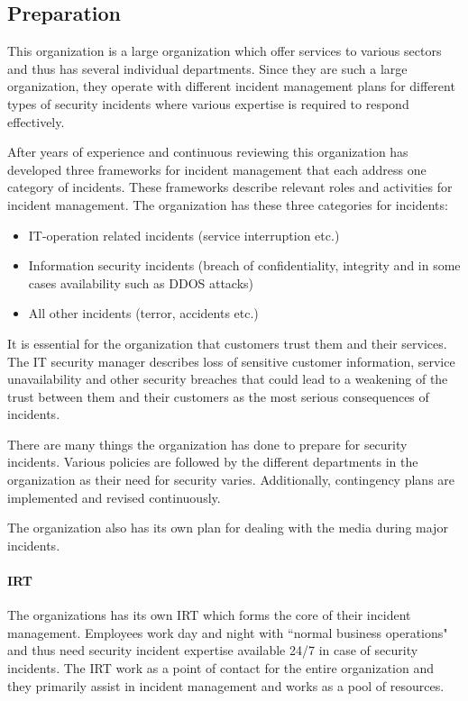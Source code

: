 \subsection{Preparation}
This organization is a large organization which offer services to various sectors and thus has several individual departments. Since they are such a large organization, they operate with different incident management plans for different types of security incidents where various expertise is required to respond effectively.  

After years of experience and continuous reviewing this organization has developed three frameworks for incident management that each address one category of incidents. These frameworks describe relevant roles and activities for incident management. The organization has these three categories for incidents:
\begin{itemize}
\item IT-operation related incidents (service interruption etc.)
\item Information security incidents (breach of confidentiality, integrity and in some cases availability such as DDOS attacks)
\item All other incidents (terror, accidents etc.)
\end{itemize}
 
It is essential for the organization that customers trust them and their services. The IT security manager  describes loss of sensitive customer information, service unavailability and other security breaches that could lead to a weakening of the trust between them and their customers as the most serious consequences of incidents. 

There are many things the organization has done to prepare for security incidents. Various policies are followed by the different departments in the organization as their need for security varies. Additionally, contingency plans are implemented and revised continuously. 

The organization also has its own plan for dealing with the media during major incidents.

\paragraph{\acl{IRT}}
The organizations has its own \ac{IRT} which forms the core of their incident management. Employees work day and night with ``normal business operations" and thus need security incident expertise available 24/7 in case of security incidents. The \ac{IRT} work as a point of contact for the entire organization and they primarily assist in incident management and works as a pool of resources.

